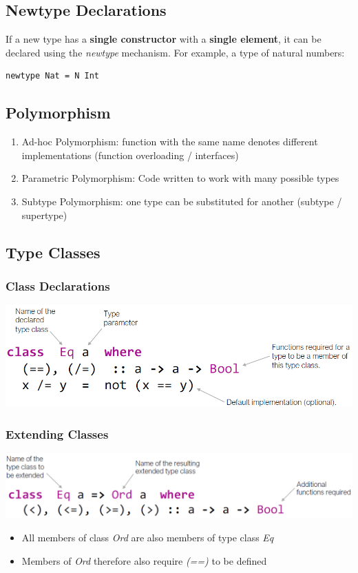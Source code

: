 \subsection{Newtype Declarations}
If a new type has a \textbf{single constructor} with a \textbf{single element}, it can be declared using the \textit{newtype} mechanism.
For example, a type of natural numbers:
\begin{lstlisting}
newtype Nat = N Int
\end{lstlisting}

\subsection{Polymorphism}
\begin{enumerate}
    \item Ad-hoc Polymorphism: function with the same name denotes different implementations (function overloading / interfaces)
    \item Parametric Polymorphism: Code written to work with many possible types
    \item Subtype Polymorphism: one type can be substituted for another (subtype / supertype)
\end{enumerate}

\subsection{Type Classes}
\subsubsection{Class Declarations}
\includegraphics[width=0.8\linewidth]{img/class_declarations.png}\\
\subsubsection{Extending Classes}
 \includegraphics[width=0.9\linewidth]{img/type_classes_extend.png}
 \begin{itemize}
     \item All members of class \textit{Ord} are also members of type class \textit{Eq}
     \item Members of \textit{Ord} therefore also require \textit{(==)} to be defined
 \end{itemize}
